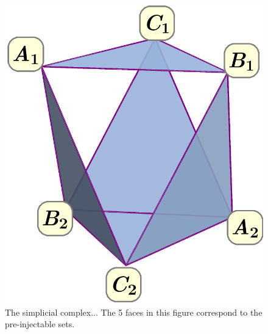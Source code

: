 {\begin{figure}[t]
\begin{minipage}[b]{0.3\linewidth}
\includegraphics[scale=0.2]{simplicialcomplex.pdf}
\caption{The simplicial complex... The 5 faces in this figure correspond to the pre-injectable sets.}\label{fig:simplicialcomplex222}
\end{minipage}
\end{figure}

}
